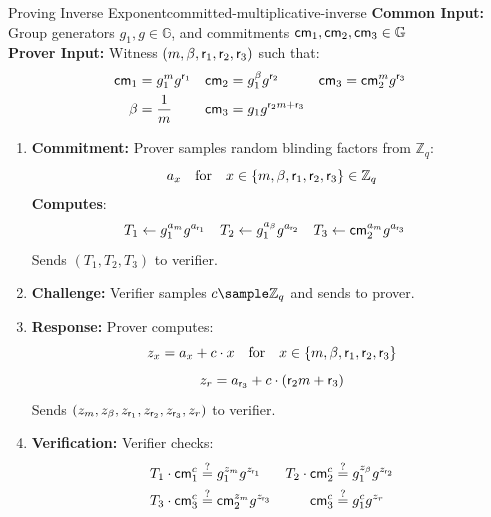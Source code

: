 \begin{protocol}{Proving Inverse Exponent}{committed-multiplicative-inverse}\label{pok-committed-multiplicative-inverse}
\textbf{Common Input:} Group generators $g_1, g \in \mathbb{G}$, and commitments $\mathsf{cm}_1, \mathsf{cm}_2, \mathsf{cm}_3 \in \mathbb{G}$\\
\textbf{Prover Input:} Witness $(m, \beta, \mathsf{r}_1, \mathsf{r}_2, \mathsf{r}_3)$ such that:
    \begin{align*}
        \mathsf{cm}_1 &= g_1^m g^{\mathsf{r}_1}     &    \mathsf{cm}_2 &= g_1^\beta g^{\mathsf{r}_2}  &   \mathsf{cm}_3 &= \mathsf{cm}_2^m g^{\mathsf{r}_3} \\
        \beta &= \frac{1}{m}     &   \mathsf{cm}_3 &= g_1 g^{\mathsf{r}_2 m + \mathsf{r}_3}
    \end{align*}
\begin{enumerate}
    \item \textbf{Commitment:} Prover samples random blinding factors from $\mathbb{Z}_q$:
       \[
        a_x \quad \text{for} \quad x \in \{ m, \beta, \mathsf{r}_1, \mathsf{r}_2, \mathsf{r}_3 \} \in \mathbb{Z}_q
       \]
    \textbf{Computes}:
    \begin{align*}
        T_1 &\gets g_1^{a_m} g^{a_{\mathsf{r}_1}}  &   T_2 &\gets g_1^{a_\beta} g^{a_{\mathsf{r}_2}}     &   T_3 &\gets \mathsf{cm}_2^{a_m} g^{a_{\mathsf{r}_3}}
    \end{align*}
    Sends $(T_1, T_2, T_3)$ to verifier.
    
    \item \textbf{Challenge:} Verifier samples $c \sample \mathbb{Z}_q$ and sends to prover.
    
    \item \textbf{Response:} Prover computes:
    \[
    z_x = a_x + c \cdot x \quad \text{for} \quad x \in \{ m, \beta, \mathsf{r}_1, \mathsf{r}_2, \mathsf{r}_3 \}
    \]
    \[
    z_r = a_{\mathsf{r}_3} + c \cdot (\mathsf{r}_2 m + \mathsf{r}_3)
    \]
    Sends $(z_m, z_\beta, z_{\mathsf{r}_1}, z_{\mathsf{r}_2}, z_{\mathsf{r}_3}, z_r)$ to verifier.
    
    \item \textbf{Verification:} Verifier checks:
    \begin{align*}
        T_1 \cdot \mathsf{cm}_1^c &\stackrel{?}{=} g_1^{z_m} g^{z_{\mathsf{r}_1}}  &
        T_2 \cdot \mathsf{cm}_2^c &\stackrel{?}{=} g_1^{z_\beta} g^{z_{\mathsf{r}_2}} \\
        T_3 \cdot \mathsf{cm}_3^c &\stackrel{?}{=} \mathsf{cm}_2^{z_m} g^{z_{\mathsf{r}_3}} &
        \mathsf{cm}_3^c &\stackrel{?}{=} g_1^c g^{z_r}
    \end{align*}
\end{enumerate}
\end{protocol}





